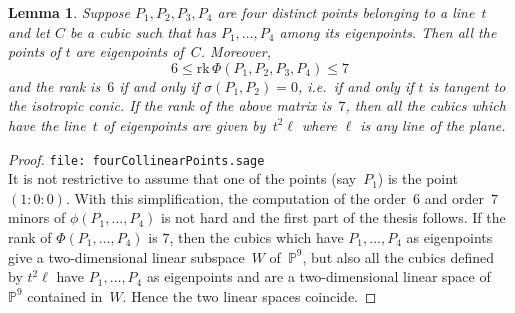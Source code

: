 \documentclass{amsart}
\theoremstyle{plain}
\newtheorem{lemma}{Lemma}[section]
\theoremstyle{definition}
\newcommand{\p}{\mathbb{P}}
\newcommand{\rk}{\ensuremath{\mathrm{rk}}}
\begin{document}
\begin{lemma}
\label{4ptiSuRetta2}
Suppose $P_1, P_2, P_3, P_4$ are four distinct points belonging to a line~$t$
and let $C$ be a cubic such that has $P_1, \dots, P_4$ among its eigenpoints.
Then all the points of $t$ are eigenpoints of~$C$.
Moreover,
%
\begin{equation*}
  6 \leq \rk \,\Phi(P_1, P_2, P_3, P_4) \leq 7
\end{equation*}
%
and the rank is~$6$ if and only if $\sigma(P_1, P_2) = 0$, i.e.\ if
and only if $t$ is tangent to the isotropic conic. If the rank of
the above matrix is~$7$, then all the cubics which have the line~$t$
of eigenpoints are given by~$t^2 \ell$ where $\ell$ is any line of the plane.
\end{lemma}
\begin{proof}
\verb+file: fourCollinearPoints.sage+\\
It is not restrictive to assume that one of the points (say~$P_1$) is
the point~$(1: 0: 0)$.
With this simplification, the computation of the order~$6$ and order~$7$
minors of $\phi(P_1, \dots, P_4)$ is not hard and
the first part of the thesis follows. If the rank of $\Phi(P_1, \dots, P_4)$
is $7$, then the cubics which have $P_1, \dots, P_4$ as eigenpoints
give a two-dimensional linear subspace~$W$ of~$\p^9$, but also all
the cubics defined by $t^2 \ell$ have $P_1, \dots, P_4$ as eigenpoints and are
a two-dimensional linear space of~$\p^9$ contained in~$W$. Hence the two linear
spaces coincide.
\end{proof}
\end{document}
